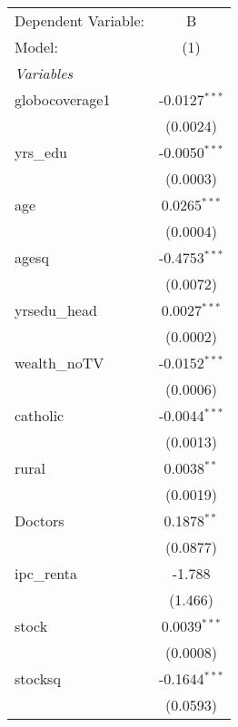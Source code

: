 \begingroup
\centering
\begin{tabular}{lc}
   \tabularnewline \midrule \midrule
   Dependent Variable:                & B\\  
   Model:                             & (1)\\  
   \midrule
   \emph{Variables}\\
   globocoverage1                     & -0.0127$^{***}$\\   
                                      & (0.0024)\\   
   yrs\_edu                           & -0.0050$^{***}$\\   
                                      & (0.0003)\\   
   age                                & 0.0265$^{***}$\\   
                                      & (0.0004)\\   
   agesq                              & -0.4753$^{***}$\\   
                                      & (0.0072)\\   
   yrsedu\_head                       & 0.0027$^{***}$\\   
                                      & (0.0002)\\   
   wealth\_noTV                       & -0.0152$^{***}$\\   
                                      & (0.0006)\\   
   catholic                           & -0.0044$^{***}$\\   
                                      & (0.0013)\\   
   rural                              & 0.0038$^{**}$\\   
                                      & (0.0019)\\   
   Doctors                            & 0.1878$^{**}$\\   
                                      & (0.0877)\\   
   ipc\_renta                         & -1.788\\   
                                      & (1.466)\\   
   stock                              & 0.0039$^{***}$\\   
                                      & (0.0008)\\   
   stocksq                            & -0.1644$^{***}$\\   
                                      & (0.0593)\\   

\end{tabular}
